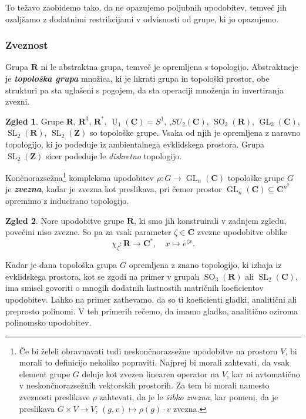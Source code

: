 \documentclass[11pt]{book}
\def\ZZ{\mathbf{Z}}
\def\RR{\mathbf{R}}
\def\CC{\mathbf{C}}
\DeclareMathOperator\GL{GL}
\DeclareMathOperator\U{U}
\DeclareMathOperator\SL{SL}
\DeclareMathOperator\SO{SO}
\def\definicija{\color{rdeca}\bf\em}
\theoremstyle{definition}
\theoremstyle{zgled}
\newtheorem*{zgled}{Zgled}
\theoremstyle{odprtproblem}
\theoremstyle{domacanaloga}
\theoremstyle{izrek}
\begin{document}
To težavo zaobidemo tako, da ne opazujemo poljubnih upodobitev, temveč jih ozaljšamo z dodatnimi restrikcijami v odvisnosti od grupe, ki jo opazujemo. 

\subsubsection{Zveznost}

Grupa $\RR$ ni le abstraktna grupa, temveč je opremljena s topologijo. Abstraktneje je {\definicija topološka grupa} množica, ki je hkrati grupa in topološki prostor, obe strukturi pa sta uglašeni s pogojem, da sta operaciji množenja in invertiranja zvezni. 

\begin{zgled}
Grupe $\RR$, $\RR^3$, $\RR^*$, $\U_1(\CC) = S^1$, ,$SU_2(\CC)$, $\SO_3(\RR)$, $\GL_3(\CC)$, $\SL_2(\RR)$, $\SL_2(\ZZ)$ so topološke grupe. Vsaka od njih je opremljena z naravno topologijo, ki jo podeduje iz ambientalnega evklidskega prostora. Grupa $\SL_2(\ZZ)$ sicer podeduje le \emph{diskretno} topologijo.
\end{zgled}

Končnorazsežna\footnote{Če bi želeli obravnavati tudi neskončnorazsežne upodobitve na prostoru $V$, bi morali to definicijo nekoliko popraviti. Najprej bi morali zahtevati, da vsak element grupe $G$ deluje kot zvezen linearen operator na $V$, kar ni avtomatično v neskončnorazsežnih vektorskih prostorih. Za tem bi morali namesto zveznosti preslikave $\rho$ zahtevati, da je le \emph{šibko zvezna}, kar pomeni, da je preslikava $G \times V \to V$, $(g,v) \mapsto \rho(g) \cdot v$ zvezna.} kompleksna upodobitev $\rho \colon G \to \GL_n(\CC)$ topološke grupe $G$ je {\definicija zvezna}, kadar je zvezna kot preslikava, pri čemer prostor $\GL_n(\CC) \subseteq \CC^{n^2}$ opremimo z inducirano topologijo.

\begin{zgled}
Nore upodobitve grupe $\RR$, ki smo jih konstruirali v zadnjem zgledu, povečini niso zvezne. So pa za vsak parameter $\zeta \in \CC$ zvezne upodobitve oblike
\[
    \chi_{\zeta} \colon \RR \to \CC^*, \quad
    x \mapsto e^{\zeta x}.
\]
\end{zgled}

Kadar je dana topološka grupa $G$ opremljena z znano topologijo, ki izhaja iz evklidskega prostora, kot se zgodi na primer v grupah $\SO_3(\RR)$ ali $\SL_2(\CC)$, ima smisel govoriti o mnogih dodatnih lastnostih matričnih koeficientov upodobitev. Lahko na primer zathevamo, da so ti koeficienti gladki, analitični ali preprosto polinomi. V teh primerih rečemo, da imamo gladko, analitično oziroma polinomsko upodobitev.
\end{document}
